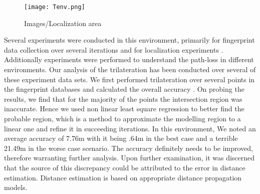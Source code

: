 \documentclass[twocolumn, 11pt]{IEEEtran}
\begin{document}


\begin{figure}[h]
\centering
\texttt{[image: Tenv.png]}
\caption{Images/Localization area }
\label{fig:tenv}
\end{figure}

Several experiments were conducted in this environment, primarily for fingerprint data collection over several iterations and for localization experiments \cite{shanmugaapriyan2014pragmatic}. Additionally experiments were performed to understand the path-loss in different environments. Our analysis of the trilateration has been conducted over several of these experiment data sets. We first performed trilateration over several points in the fingerprint databases and calculated the overall accuracy \cite{shanmugaapriyan2014pragmatic}. On probing the results, we find that for the majority of the points the intersection region was inaccurate. Hence we used non linear least square regression to better find the probable region, which is a method to approximate the modelling region to a linear one and refine it in succeeding iterations. In this environment, We noted an average accuracy of 7.76m with it being .64m in the best case and a terrible 21.49m in the worse case scenario. 
The accuracy definitely needs to be improved, therefore warranting further analysis. Upon further examination, it was discerned that the source of this discrepancy could be attributed to the error in distance estimation. Distance estimation is based on appropriate distance propagation models.
\end{document}

